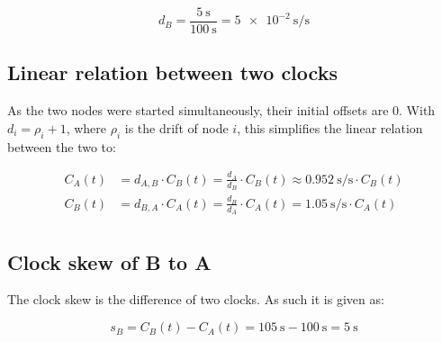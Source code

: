 \documentclass[a4paper]{scrreprt}
\begin{document}
\[
		d_B = \frac{\SI{5}{\s}}{\SI{100}{\s}} = \SI{5e-2}{\s \per \s}
\]

\subsection{Linear relation between two clocks}

As the two nodes were started simultaneously, their initial offsets are $0$.
With $d_i = \rho_i + 1$, where $\rho_i$ is the drift of node $i$, this
simplifies the linear relation between the two to:

\begin{align*}
		C_A(t) & = d_{A, B} \cdot C_B(t) = \frac{d_A}{d_B} \cdot C_B(t) \approx \SI{0.952}{\s \per \s} \cdot C_B(t) \\
		C_B(t) & = d_{B, A} \cdot C_A(t) = \frac{d_B}{d_A} \cdot C_A(t) = \SI{1.05}{\s \per \s} \cdot C_A(t) \\
\end{align*}

\subsection{Clock skew of B to A}

The clock skew is the difference of two clocks. As such it is given as:

\[
		s_B = C_B(t) - C_A(t) = \SI{105}{\s} - \SI{100}{\s} = \SI{5}{\s}
\]
\end{document}

